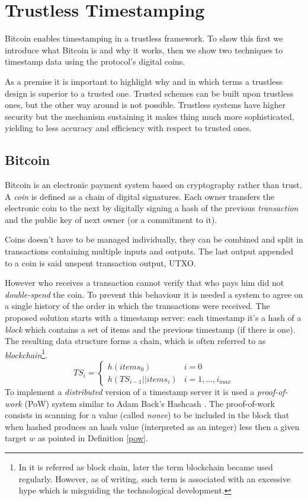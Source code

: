 \chapter{Trustless Timestamping}
\label{chpr:trustless}
Bitcoin enables timestamping in a trustless framework. 
To show this first we introduce what Bitcoin is and why it works, then we show two techniques to timestamp data using the protocol's digital coins.

As a premise it is important to highlight why and in which terms a trustless design is superior to a trusted one. 
Trusted schemes can be built upon trustless ones, but the other way around is not possible. 
Trustless systems have higher security but the mechanism sustaining it makes thing much more sophisticated, yielding to less accuracy and efficiency with respect to trusted ones.

\section{Bitcoin}
\label{bitcoin}
Bitcoin is an electronic payment system based on cryptography rather than trust. A \textit{coin} is defined as a chain of digital signatures. Each owner transfers the electronic coin to the next by digitally signing a hash of the previous \textit{transaction} and the public key of next owner (or a commitment to it).

Coins doesn't have to be managed individually, they can be combined and split in transactions containing multiple inputs and outputs. The last output appended to a coin is said unspent transaction output, UTXO.

However who receives a transaction cannot verify that who pays him did not \textit{double-spend} the coin. 
To prevent this behaviour it is needed a system to agree on a single history of the order in which the transactions were received. The proposed solution starts with a timestamp server: each timestamp it's a hash of a \textit{block} which contains a set of items and the previous timestamp (if there is one). The resulting data structure forms a chain, which is often referred to as \textit{blockchain}\footnote{In \cite{Nakamoto_bitcoin:a} it is referred as block chain, later the term blockchain became used regularly. However, as of writing, such term is associated with an excessive hype which is misguiding the technological development.}. 
\begin{equation}
	TS_i =
	\begin{cases} 
		h(items_0) & i=0\\ 
		h(TS_{i-1} || items_i) & i=1, ..., i_{max} 
	\end{cases}
\end{equation}
To implement a \textit{distributed} version of a timestamp server it is used a \textit{proof-of-work} (PoW) system similar to Adam Back's Hashcash \cite{Back02hashcash-}. The proof-of-work consists in scanning for a value (called \textit{nonce}) to be included in the block that when hashed produces an hash value (interpreted as an integer) less then a given target $w$ as pointed in Definition \ref{pow}.

